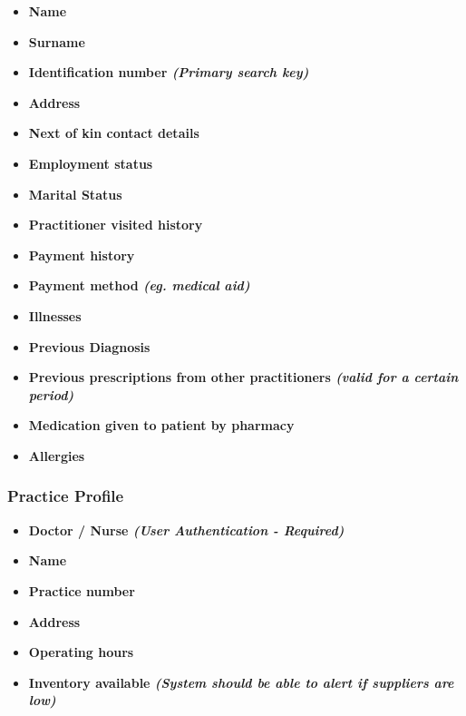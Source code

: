 \documentclass[a4paper]{article}
\begin{document}
\begin{itemize}

\item \textbf{Name}

\item \textbf{Surname}

\item \textbf{Identification number \emph{(Primary search key)}}

\item \textbf{Address}

\item \textbf{Next of kin contact details}

\item \textbf{Employment status}

\item \textbf{Marital Status}

\item \textbf{Practitioner visited history}

\item \textbf{Payment history}

\item \textbf{Payment method \emph{(eg. medical aid)}} 

\item \textbf{Illnesses}

\item \textbf{Previous Diagnosis}

\item \textbf{Previous prescriptions from other practitioners \emph{(valid for a certain period)}}

\item \textbf{Medication given to patient by pharmacy}

\item \textbf{Allergies}

\end{itemize}

\subsubsection{Practice Profile}

\begin{itemize}

\item \textbf{Doctor / Nurse \emph{(User Authentication - Required)}}

\item \textbf{Name}

\item \textbf{Practice number}

\item \textbf{Address}

\item \textbf{Operating hours}

\item \textbf{Inventory available \emph{(System should be able to alert if suppliers are low)}}

\end{itemize}
\end{document}
